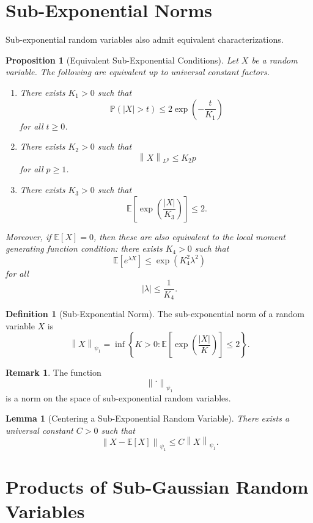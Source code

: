 \documentclass[12pt,oneside]{book}
\numberwithin{equation}{section}
\theoremstyle{definition}
\newtheorem{definition}{Definition}[section]
\newtheorem{remark}{Remark}[section]
\theoremstyle{plain}
\newtheorem{lemma}{Lemma}[section]
\newtheorem{proposition}{Proposition}[section]
\theoremstyle{remark}
\newcommand{\E}{\mathbb{E}}
\newcommand{\Prob}{\mathbb{P}}
\newcommand{\norm}[1]{\left\lVert #1 \right\rVert}
\begin{document}
\section{Sub-Exponential Norms}

Sub-exponential random variables also admit equivalent characterizations.

\begin{proposition}[Equivalent Sub-Exponential Conditions]
Let $X$ be a random variable. The following are equivalent up to universal constant factors.

\begin{enumerate}
\item There exists $K_1>0$ such that
\[
\Prob(|X|>t)
\leq
2\exp\left(
-\frac{t}{K_1}
\right)
\]
for all $t\geq0$.

\item There exists $K_2>0$ such that
\[
\norm{X}_{L^p}
\leq
K_2p
\]
for all $p\geq1$.

\item There exists $K_3>0$ such that
\[
\E\left[
\exp\left(
\frac{|X|}{K_3}
\right)
\right]
\leq
2.
\]
\end{enumerate}

Moreover, if $\E[X]=0$, then these are also equivalent to the local moment generating function condition: there exists $K_4>0$ such that
\[
\E[e^{\lambda X}]
\leq
\exp(K_4^2\lambda^2)
\]
for all
\[
|\lambda|\leq \frac{1}{K_4}.
\]
\end{proposition}

\begin{definition}[Sub-Exponential Norm]
The sub-exponential norm of a random variable $X$ is
\[
\norm{X}_{\psi_1}
=
\inf\left\{
K>0:
\E\left[
\exp\left(
\frac{|X|}{K}
\right)
\right]
\leq
2
\right\}.
\]
\end{definition}

\begin{remark}
The function
\[
\norm{\cdot}_{\psi_1}
\]
is a norm on the space of sub-exponential random variables.
\end{remark}

\begin{lemma}[Centering a Sub-Exponential Random Variable]
There exists a universal constant $C>0$ such that
\[
\norm{X-\E[X]}_{\psi_1}
\leq
C\norm{X}_{\psi_1}.
\]
\end{lemma}

\section{Products of Sub-Gaussian Random Variables}
\end{document}
